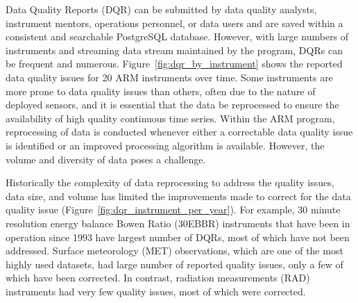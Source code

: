 Data Quality Reports (DQR) can be submitted by data quality analysts,
instrument mentors, operations personnel, or data users and
are saved within a consistent and searchable PostgreSQL database.
However, with large numbers of instruments and streaming data stream
maintained by the program, DQRs can be frequent and numerous. 
Figure~\ref{fig:dqr_by_instrument} shows the reported data quality
issues for 20 ARM instruments over time. Some instruments are more prone
to data quality issues than others, often due to the nature of deployed
sensors, and it is essential that the data be reprocessed to ensure the
availability of high quality continuous time series. Within the ARM program,
reprocessing of data is conducted whenever either a correctable data
quality issue is identified or an
improved processing algorithm is available. However, the volume and
diversity of data poses a challenge.

Historically the complexity of data reprocessing to address the quality
issues, data size, and volume has limited the improvements made to
correct for the data quality issue
(Figure~\ref{fig:dqr_instrument_per_year}). For example, 30 minute
resolution energy balance Bowen Ratio (30EBBR)
instruments that have been in operation since 1993 have largest number of
DQRs, most of which have not been addressed. Surface meteorology (MET)
observations, which are one of the most highly used datasets, had large number of
reported quality issues, only a few of which have been corrected. In
contrast, radiation measurements (RAD) instruments had very few quality
issues, most of which were corrected. 


